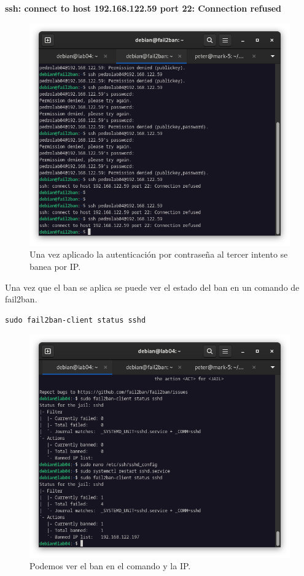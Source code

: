 \textbf{ssh: connect to host 192.168.122.59 port 22: Connection refused}
\begin{figure}[H]
	\centering
	\includegraphics[scale=0.40]{07}
	\caption{Una vez aplicado la autenticación por contraseña al tercer intento se banea por IP.}
\end{figure}

Una vez que el ban se aplica se puede ver el estado del ban en un comando de fail2ban.

\begin{lstlisting}[style=mybash]
sudo fail2ban-client status sshd
\end{lstlisting}

\begin{figure}[H]
	\centering
	\includegraphics[scale=0.40]{08}
	\caption{Podemos ver el ban en el comando y la IP.}
\end{figure}


